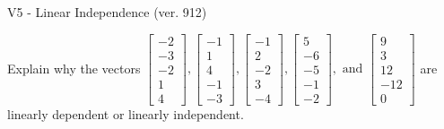 \begin{exercise}
  \begin{exerciseTitle}V5 - Linear Independence (ver. 912)\end{exerciseTitle}
  \begin{exerciseStatement}
    Explain why the vectors \(\left[\begin{array}{r}
-2 \\
-3 \\
-2 \\
1 \\
4
\end{array}\right] , \left[\begin{array}{r}
-1 \\
1 \\
4 \\
-1 \\
-3
\end{array}\right] , \left[\begin{array}{r}
-1 \\
2 \\
-2 \\
3 \\
-4
\end{array}\right] , \left[\begin{array}{r}
5 \\
-6 \\
-5 \\
-1 \\
-2
\end{array}\right] , \text{ and } \left[\begin{array}{r}
9 \\
3 \\
12 \\
-12 \\
0
\end{array}\right]\) are linearly dependent or linearly independent.	



\end{exerciseStatement}
\end{exercise}
